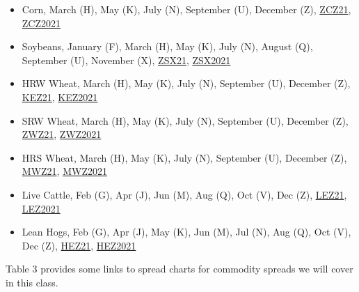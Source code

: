 \documentclass[
  letterpaper,
  DIV=11,
  numbers=noendperiod]{scrreprt}
\begin{document}
\begin{itemize}
\item
  Corn, March (H), May (K), July (N), September (U), December (Z),
  \href{https://www.barchart.com/futures/quotes/ZCZ21/overview}{ZCZ21},
  \href{www.tradingview.com}{ZCZ2021}
\item
  Soybeans, January (F), March (H), May (K), July (N), August (Q),
  September (U), November (X),
  \href{https://www.barchart.com/futures/quotes/ZSX21/overview}{ZSX21},
  \href{www.tradingview.com}{ZSX2021}
\item
  HRW Wheat, March (H), May (K), July (N), September (U), December (Z),
  \href{https://www.barchart.com/futures/quotes/KEZ21/overview}{KEZ21},
  \href{www.tradingview.com}{KEZ2021}
\item
  SRW Wheat, March (H), May (K), July (N), September (U), December (Z),
  \href{https://www.barchart.com/futures/quotes/ZWZ21/overview}{ZWZ21},
  \href{https://wwwww.tradingview.com}{ZWZ2021}
\item
  HRS Wheat, March (H), May (K), July (N), September (U), December (Z),
  \href{https://www.barchart.com/futures/quotes/MWZ21/overview}{MWZ21},
  \href{www.tradingview.com}{MWZ2021}
\item
  Live Cattle, Feb (G), Apr (J), Jun (M), Aug (Q), Oct (V), Dec (Z),
  \href{https://www.barchart.com/futures/quotes/LEZ21/overview}{LEZ21},
  \href{https:/www.tradingview.com}{LEZ2021}
\item
  Lean Hogs, Feb (G), Apr (J), May (K), Jun (M), Jul (N), Aug (Q), Oct
  (V), Dec (Z),
  \href{httphttps://www.barchart.com/futures/quotes/HEZ21/overview}{HEZ21},
  \href{https:/www.tradingview.com}{HEZ2021}
\end{itemize}

Table 3 provides some links to spread charts for commodity spreads we
will cover in this class.
\end{document}
